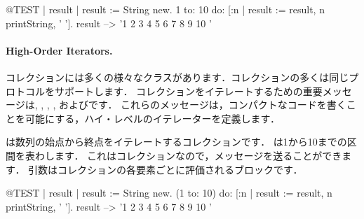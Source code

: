 \documentclass[a4paper,10pt,twoside]{book}
\begin{document}
\begin{code}{@TEST | result |}
result := String new.
1 to: 10 do: [:n | result := result, n printString, ' '].
result --> '1 2 3 4 5 6 7 8 9 10 '
\end{code}


\paragraph{High-Order Iterators.}
コレクションには多くの様々なクラスがあります．コレクションの多くは同じプロトコルをサポートします．
コレクションをイテレートするための重要メッセージは, , , , およびです．
これらのメッセージは，コンパクトなコードを書くことを可能にする，ハイ・レベルのイテレーターを定義します．

は数列の始点から終点をイテレートするコレクションです．
は1から10までの区間を表わします．
これはコレクションなので，メッセージを送ることができます．
引数はコレクションの各要素ごとに評価されるブロックです．

\begin{code}{@TEST | result |}
result := String new.
(1 to: 10) do: [:n | result := result, n printString, ' '].
result --> '1 2 3 4 5 6 7 8 9 10 '
\end{code}
\end{document}
